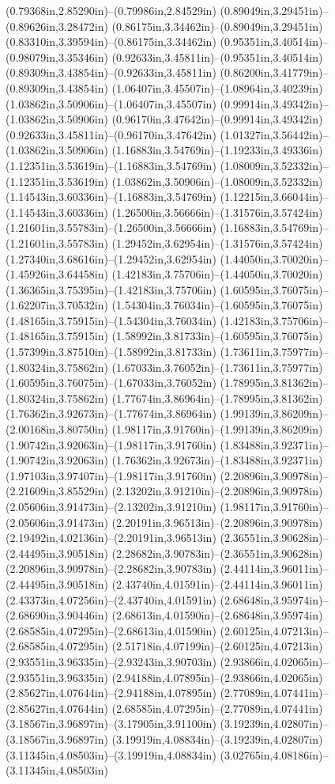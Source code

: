 (0.79368in,2.85290in)--(0.79986in,2.84529in) (0.89049in,3.29451in)--(0.89626in,3.28472in) (0.86175in,3.34462in)--(0.89049in,3.29451in) (0.83310in,3.39594in)--(0.86175in,3.34462in) (0.95351in,3.40514in)--(0.98079in,3.35346in) (0.92633in,3.45811in)--(0.95351in,3.40514in) (0.89309in,3.43854in)--(0.92633in,3.45811in) (0.86200in,3.41779in)--(0.89309in,3.43854in) (1.06407in,3.45507in)--(1.08964in,3.40239in) (1.03862in,3.50906in)--(1.06407in,3.45507in) (0.99914in,3.49342in)--(1.03862in,3.50906in) (0.96170in,3.47642in)--(0.99914in,3.49342in) (0.92633in,3.45811in)--(0.96170in,3.47642in) (1.01327in,3.56442in)--(1.03862in,3.50906in) (1.16883in,3.54769in)--(1.19233in,3.49336in) (1.12351in,3.53619in)--(1.16883in,3.54769in) (1.08009in,3.52332in)--(1.12351in,3.53619in) (1.03862in,3.50906in)--(1.08009in,3.52332in) (1.14543in,3.60336in)--(1.16883in,3.54769in) (1.12215in,3.66044in)--(1.14543in,3.60336in) (1.26500in,3.56666in)--(1.31576in,3.57424in) (1.21601in,3.55783in)--(1.26500in,3.56666in) (1.16883in,3.54769in)--(1.21601in,3.55783in) (1.29452in,3.62954in)--(1.31576in,3.57424in) (1.27340in,3.68616in)--(1.29452in,3.62954in) (1.44050in,3.70020in)--(1.45926in,3.64458in) (1.42183in,3.75706in)--(1.44050in,3.70020in) (1.36365in,3.75395in)--(1.42183in,3.75706in) (1.60595in,3.76075in)--(1.62207in,3.70532in) (1.54304in,3.76034in)--(1.60595in,3.76075in) (1.48165in,3.75915in)--(1.54304in,3.76034in) (1.42183in,3.75706in)--(1.48165in,3.75915in) (1.58992in,3.81733in)--(1.60595in,3.76075in) (1.57399in,3.87510in)--(1.58992in,3.81733in) (1.73611in,3.75977in)--(1.80324in,3.75862in) (1.67033in,3.76052in)--(1.73611in,3.75977in) (1.60595in,3.76075in)--(1.67033in,3.76052in) (1.78995in,3.81362in)--(1.80324in,3.75862in) (1.77674in,3.86964in)--(1.78995in,3.81362in) (1.76362in,3.92673in)--(1.77674in,3.86964in) (1.99139in,3.86209in)--(2.00168in,3.80750in) (1.98117in,3.91760in)--(1.99139in,3.86209in) (1.90742in,3.92063in)--(1.98117in,3.91760in) (1.83488in,3.92371in)--(1.90742in,3.92063in) (1.76362in,3.92673in)--(1.83488in,3.92371in) (1.97103in,3.97407in)--(1.98117in,3.91760in) (2.20896in,3.90978in)--(2.21609in,3.85529in) (2.13202in,3.91210in)--(2.20896in,3.90978in) (2.05606in,3.91473in)--(2.13202in,3.91210in) (1.98117in,3.91760in)--(2.05606in,3.91473in) (2.20191in,3.96513in)--(2.20896in,3.90978in) (2.19492in,4.02136in)--(2.20191in,3.96513in) (2.36551in,3.90628in)--(2.44495in,3.90518in) (2.28682in,3.90783in)--(2.36551in,3.90628in) (2.20896in,3.90978in)--(2.28682in,3.90783in) (2.44114in,3.96011in)--(2.44495in,3.90518in) (2.43740in,4.01591in)--(2.44114in,3.96011in) (2.43373in,4.07256in)--(2.43740in,4.01591in) (2.68648in,3.95974in)--(2.68690in,3.90446in) (2.68613in,4.01590in)--(2.68648in,3.95974in) (2.68585in,4.07295in)--(2.68613in,4.01590in) (2.60125in,4.07213in)--(2.68585in,4.07295in) (2.51718in,4.07199in)--(2.60125in,4.07213in) (2.93551in,3.96335in)--(2.93243in,3.90703in) (2.93866in,4.02065in)--(2.93551in,3.96335in) (2.94188in,4.07895in)--(2.93866in,4.02065in) (2.85627in,4.07644in)--(2.94188in,4.07895in) (2.77089in,4.07441in)--(2.85627in,4.07644in) (2.68585in,4.07295in)--(2.77089in,4.07441in) (3.18567in,3.96897in)--(3.17905in,3.91100in) (3.19239in,4.02807in)--(3.18567in,3.96897in) (3.19919in,4.08834in)--(3.19239in,4.02807in) (3.11345in,4.08503in)--(3.19919in,4.08834in) (3.02765in,4.08186in)--(3.11345in,4.08503in) 